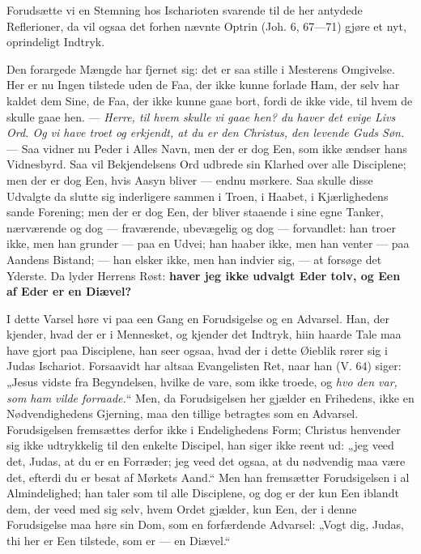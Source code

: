 \documentclass[12pt,a4paper]{book}
\begin{document}
Forudsætte vi en Stemning hos Ischarioten svarende til de her antydede Reflerioner, da
vil ogsaa det forhen nævnte Optrin (Joh. 6, 67---71) gjøre et nyt, oprindeligt Indtryk.

Den forargede Mængde har fjernet sig: det er saa stille i Mesterens Omgivelse. Her er nu
Ingen tilstede uden de Faa, der ikke kunne forlade Ham, der selv har kaldet dem Sine, de
Faa, der ikke kunne gaae bort, fordi de ikke vide, til hvem de skulle gaae hen. ---
\emph{Herre, til hvem skulle vi gaae hen?
du haver det evige Livs Ord. Og vi have troet og erkjendt, at du er den Christus, den
levende Guds Søn.} --- Saa vidner nu Peder i Alles Navn, men der er dog Een, som ikke
ændser hans Vidnesbyrd. Saa vil Bekjendelsens Ord udbrede sin Klarhed over alle
Disciplene; men der er dog Een, hvis Aasyn bliver --- endnu mørkere. Saa skulle disse
Udvalgte da slutte sig inderligere sammen i Troen, i Haabet, i Kjærlighedens sande
Forening; men der er dog Een, der bliver staaende i sine egne Tanker, nærværende og dog
--- fraværende, ubevægelig og dog --- forvandlet: han troer ikke, men han grunder ---
paa en Udvei; han haaber ikke, men han venter --- paa Aandens Bistand; --- han elsker
ikke, men han indvier sig, --- at forsøge det Yderste. Da lyder Herrens Røst:
\textbf{haver jeg ikke udvalgt Eder tolv, og Een af Eder er en Diævel?}

I dette Varsel høre vi paa een Gang en Forudsigelse og en Advarsel. Han, der kjender,
hvad der er i Mennesket, og kjender det Indtryk, hiin haarde Tale maa have gjort paa
Disciplene, han seer ogsaa, hvad der i dette Øieblik rører sig i Judas Ischariot.
Forsaavidt har altsaa Evangelisten Ret, naar han (V. 64) siger: „Jesus vidste fra
Begyndelsen, hvilke de vare, som ikke troede, og \emph{hvo den var, som ham vilde
forraade.}“ Men, da Forudsigelsen her gjælder en Frihedens, ikke en Nødvendighedens
Gjerning, maa den tillige betragtes som en Advarsel. Forudsigelsen fremsættes derfor
ikke i Endelighedens Form; Christus henvender sig ikke udtrykkelig til den enkelte
Discipel, han siger ikke reent ud: „jeg veed det, Judas, at du er en Forræder; jeg veed
det ogsaa, at du nødvendig maa være det, efterdi du er besat af Mørkets Aand.“ Men han
fremsætter Forudsigelsen i al Almindelighed; han taler som til alle Disciplene, og dog
er der kun Een iblandt dem, der veed med sig selv, hvem Ordet gjælder, kun Een, der i
denne
Forudsigelse maa høre sin Dom, som en forfærdende Advarsel: „Vogt dig, Judas, thi her er
Een tilstede, som er --- en Diævel.“
\end{document}
